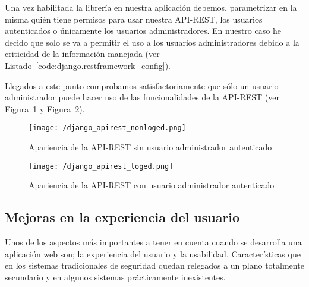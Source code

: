 \hfill


Una vez habilitada la librería en nuestra aplicación debemos, parametrizar en la misma quién tiene permisos para usar nuestra \acs{API}-\acs{REST}, los usuarios autenticados o únicamente los usuarios administradores. En nuestro caso he decido que solo se va a permitir el uso a los usuarios administradores debido a la criticidad de la información manejada (ver Listado~\ref{code:django.restframework_config}).





Llegados a este punto comprobamos satisfactoriamente que sólo un usuario administrador puede hacer uso de las funcionalidades de la \acs{API}-\acs{REST} (ver Figura~\ref{fig:django_apirest_nonloged} y Figura~\ref{fig:django_apirest_loged}).

\begin{figure}[!h]
\centering
\texttt{[image: /django\_apirest\_nonloged.png]}
\caption{Apariencia de la \acs{API}-\acs{REST} sin usuario administrador autenticado}
\label{fig:django_apirest_nonloged}
\end{figure}

\begin{figure}[!h]
\centering
\texttt{[image: /django\_apirest\_loged.png]}
\caption{Apariencia de la \acs{API}-\acs{REST} con usuario administrador autenticado}
\label{fig:django_apirest_loged}
\end{figure}

\subsection{Mejoras en la experiencia del usuario}

Unos de los aspectos más importantes a tener en cuenta cuando se desarrolla una aplicación web son; la experiencia del usuario y la usabilidad. Características que en los sistemas tradicionales de seguridad quedan relegados a un plano totalmente secundario y en algunos sistemas prácticamente inexistentes. 


